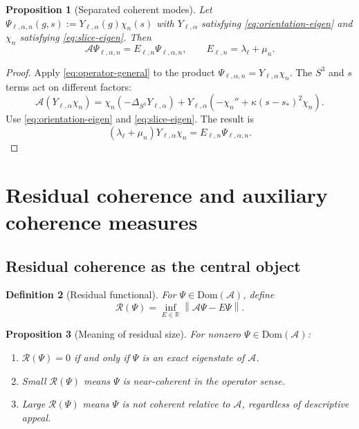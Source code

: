 \documentclass[11pt]{article}
\newtheorem{definition}{Definition}[section]
\newtheorem{proposition}[definition]{Proposition}
\theoremstyle{remark}
\newcommand{\R}{\mathbb{R}}
\newcommand{\norm}[1]{\left\lVert #1 \right\rVert}
\newcommand{\Aop}{\mathcal{A}}
\newcommand{\Res}{\mathcal{R}}
\begin{document}
\begin{proposition}[Separated coherent modes]
Let $\Psi_{\ell,\alpha,n}(g,s):=Y_{\ell,\alpha}(g)\chi_n(s)$ with $Y_{\ell,\alpha}$ satisfying \eqref{eq:orientation-eigen} and $\chi_n$ satisfying \eqref{eq:slice-eigen}. Then
\begin{equation}
\Aop\Psi_{\ell,\alpha,n}=E_{\ell,n}\Psi_{\ell,\alpha,n},
\qquad
E_{\ell,n}=\lambda_\ell+\mu_n.
\label{eq:product-eigen}
\end{equation}
\end{proposition}

\begin{proof}
Apply \eqref{eq:operator-general} to the product $\Psi_{\ell,\alpha,n}=Y_{\ell,\alpha}\chi_n$. The $S^3$ and $s$ terms act on different factors:
\[
\Aop(Y_{\ell,\alpha}\chi_n)
=
\chi_n(-\Delta_{S^3}Y_{\ell,\alpha})
+
Y_{\ell,\alpha}\!\left(-\chi_n''+\kappa(s-s_*)^2\chi_n\right).
\]
Use \eqref{eq:orientation-eigen} and \eqref{eq:slice-eigen}. The result is
\[
(\lambda_\ell+\mu_n)Y_{\ell,\alpha}\chi_n
=
E_{\ell,n}\Psi_{\ell,\alpha,n}.
\]
\end{proof}

\section{Residual coherence and auxiliary coherence measures}

\subsection{Residual coherence as the central object}

\begin{definition}[Residual functional]
For $\Psi\in\mathrm{Dom}(\Aop)$, define
\begin{equation}
\Res(\Psi)=\inf_{E\in\R}\norm{\Aop\Psi-E\Psi}.
\label{eq:residual}
\end{equation}
\end{definition}

\begin{proposition}[Meaning of residual size]
For nonzero $\Psi\in\mathrm{Dom}(\Aop)$:
\begin{enumerate}
\item $\Res(\Psi)=0$ if and only if $\Psi$ is an exact eigenstate of $\Aop$.
\item Small $\Res(\Psi)$ means $\Psi$ is near-coherent in the operator sense.
\item Large $\Res(\Psi)$ means $\Psi$ is not coherent relative to $\Aop$, regardless of descriptive appeal.
\end{enumerate}
\end{proposition}
\end{document}
